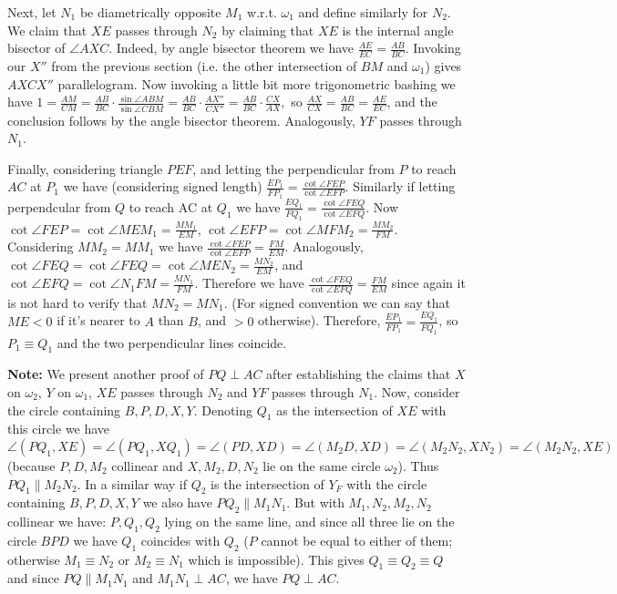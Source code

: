 \documentclass[11pt,a4paper]{article}
\begin{document}
\begin{itemize}
Next, let $N_1$ be diametrically opposite $M_1$ w.r.t. $\omega_1$ and define similarly for $N_2$. We claim that $XE$ passes through $N_2$ by claiming that $XE$ is the internal angle bisector of $\angle AXC$. Indeed, by angle bisector theorem we have $\frac{AE}{EC}=\frac{AB}{BC}$. Invoking our $X''$ from the previous section (i.e. the other intersection of $BM$ and $\omega_1$) gives $AXCX''$ parallelogram. Now invoking a little bit more trigonometric bashing we have $1=\frac{AM}{CM}=\frac{AB}{BC}\cdot\frac{\sin\angle ABM}{\sin\angle CBM}=\frac{AB}{BC}\cdot\frac{AX''}{CX''}=\frac{AB}{BC}\cdot\frac{CX}{AX},$ so $\frac{AX}{CX}=\frac{AB}{BC}=\frac{AE}{EC}$, and the conclusion follows by the angle bisector theorem. Analogously, $YF$ passes through $N_1$.

Finally, considering triangle $PEF$, and letting the perpendicular from $P$ to reach $AC$ at $P_1$ we have (considering signed length) $\frac{EP_1}{FP_1}=\frac{\cot\angle FEP}{\cot\angle EFP}$. Similarly if letting perpendcular from $Q$ to reach AC at $Q_1$ we have $\frac{EQ_1}{FQ_1}=\frac{\cot\angle FEQ}{\cot\angle EFQ}$. Now $\cot\angle FEP=\cot\angle MEM_1=\frac{MM_1}{EM}$, $\cot\angle EFP=\cot\angle MFM_2=\frac{MM_2}{FM}$. Considering $MM_2=MM_1$ we have $\frac{\cot\angle FEP}{\cot\angle EFP}=\frac{FM}{EM}$. Analogously, $\cot\angle FEQ=\cot\angle FEQ=\cot\angle MEN_2=\frac{MN_2}{EM}$, and $\cot\angle EFQ=\cot\angle N_1FM=\frac{MN_1}{FM}$. Therefore we have $\frac{\cot\angle FEQ}{\cot\angle EFQ}=\frac{FM}{EM}$ since again it is not hard to verify that $MN_2=MN_1$. (For signed convention we can say that $ME<0$ if it's nearer to $A$ than $B$, and $>0$ otherwise). Therefore, $\frac{EP_1}{FP_1}=\frac{EQ_1}{FQ_1}$, so $P_1\equiv Q_1$ and the two perpendicular lines coincide.

\textbf{Note:} We present another proof of $PQ\perp AC$ after establishing the claims that $X$ on $\omega_2$, $Y$ on $\omega_1$, $XE$ passes through $N_2$ and $YF$ passes through $N_1$. Now, consider the circle containing $B, P, D, X, Y$. 
Denoting $Q_1$ as the intersection of $XE$ with this circle we have $\angle (PQ_1, XE)=\angle (PQ_1, XQ_1)=\angle (PD, XD)=\angle (M_2D, XD)=\angle (M_2N_2, XN_2)=\angle (M_2N_2, XE)$ (because $P, D, M_2$ collinear and $X, M_2, D, N_2$ lie on the same circle $\omega_2$). Thus $PQ_1\parallel M_2N_2$. In a similar way if $Q_2$ is the intersection of $Y_F$ with the circle containing $B, P, D, X, Y$ we also have $PQ_2\parallel M_1N_1$. But with $M_1, N_2, M_2, N_2$ collinear we have: $P, Q_1, Q_2$ lying on the same line, and since all three lie on the circle $BPD$ we have $Q_1$ coincides with $Q_2$ ($P$ cannot be equal to either of them; otherwise $M_1\equiv N_2$ or $M_2\equiv N_1$ which is impossible). This gives $Q_1\equiv Q_2\equiv Q$ and since $PQ\parallel M_1N_1$ and $M_1N_1\perp AC$, we have $PQ\perp AC$. 


\end{itemize}
\end{document}
